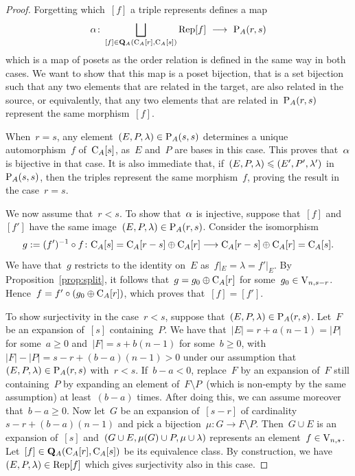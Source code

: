 \begin{proof}
Forgetting which~$[f]$ a triple represents defines  a  map 
$$\alpha\colon\bigsqcup_{[f]\in \mathbf{Q}_A(\mathrm{C}_A[r],\mathrm{C}_A[s])}\operatorname{Rep}[f] \ \longrightarrow\ \mathrm{P}_A(r,s)$$
which is a map of posets as the order relation is defined in the same way in both cases. We want to show that this map is a poset bijection, that is a set bijection such that any two elements that are related in the target, are also related in the source, or equivalently, that any two elements that are related  in~$\mathrm{P}_A(r,s)$ represent the same morphism~$[f]$. 

When~$r=s$,  any element~$(E,P,\lambda)\in \mathrm{P}_A(s,s)$ determines a unique automorphism~$f$ of~$\mathrm{C}_A[s]$, as~$E$ and~$P$ are bases in this case. This proves that~$\alpha$ is bijective
in that case. 
It is also immediate that, if~\hbox{$(E,P,\lambda)\leqslant (E',P',\lambda')$} in~$\mathrm{P}_A(s,s)$, then the triples represent the same morphism~$f$, proving the result in the case~$r=s$. 

We now assume that~$r<s$. To show that~$\alpha$ is injective, 
suppose that~$[f]$ and~$[f']$ have the same image~\hbox{$(E,P,\lambda)\in\mathrm{P}_A(r,s)$}. 
Consider the isomorphism 
\[
g:=(f')^{-1}\circ f\colon\mathrm{C}_A[s]=\mathrm{C}_A[r-s]\oplus \mathrm{C}_A[r]\longrightarrow \mathrm{C}_A[r-s]\oplus \mathrm{C}_A[r]=\mathrm{C}_A[s].
\]
We have that~$g$ restricts to the identity on~$E$ as~$f|_E=\lambda=f'|_E$. By Proposition~\ref{prop:split},  it follows that~\hbox{$g=g_0\oplus\mathrm{C}_A[r]$} for some~$g_0\in\mathrm{V}_{n,s-r}$. %
Hence~$f=f'\circ (g_0\oplus \mathrm{C}_A[r])$, which proves that~$[f]=[f']$.  

To show surjectivity 
in the case~$r<s$, suppose that~$(E,P,\lambda)\in \mathrm{P}_A(r,s)$. 
Let~$F$ be an expansion  of~$[s]$ containing~$P$. We have that~\hbox{$|E|=r+a(n-1)=|P|$} for some~$a\geqslant0$ and~$|F|=s+b(n-1)$ for some~\hbox{$b\geqslant0$}, with~\hbox{$|F|-|P|=s-r+(b-a)(n-1)>0$} under our assumption that~$(E,P,\lambda)\in \mathrm{P}_A(r,s)$ with~\hbox{$r<s$}. If~\hbox{$b-a<0$}, 
replace~$F$ by an expansion of~$F$ still containing~$P$ by expanding an element of~\hbox{$F\setminus P$}~(which is non-empty by the same assumption) at least~$(b-a)$ times. 
After doing this, we can assume moreover  that~\hbox{$b-a\geqslant0$}. Now let~$G$ be an expansion of~$[s-r]$ of cardinality~$s-r+(b-a)(n-1)$ and pick a bijection~$\mu\colon G\to F\setminus P$. 
Then~$G\cup E$ is an expansion of~$[s]$ and~$(G\cup E,\mu(G)\cup P,\mu\cup\lambda)$ represents an element~$f\in\mathrm{V}_{n,s}$. Let~$[f]\in \mathbf{Q}_A(\mathrm{C}_A[r],\mathrm{C}_A[s])$ be its equivalence class. 
By construction, we have~\hbox{$(E,P,\lambda)\in \operatorname{Rep}[f]$} which gives surjectivity 
also in this case. 



\end{proof}
